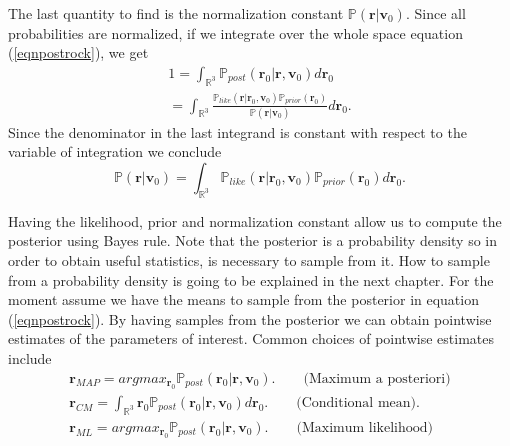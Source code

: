 \documentclass[12pt]{book}
\newcommand{\post}{\mathbb{P}_{post}}
\newcommand{\like}{\mathbb{P}_{like}}
\newcommand{\prior}{\mathbb{P}_{prior}}
\newcommand{\p}{\mathbb{P}}
\begin{document}
The last quantity to find is   the normalization constant $\p(\textbf{r}|\textbf{v}_{0})$. Since all
probabilities  are normalized, if we integrate over the whole space equation (\ref{eqnpostrock}), we get
\begin{eqnarray*}
1=\int_{\mathbb{R}^{3}}\post(\textbf{r}_{0}|\textbf{r},\textbf{v}_{0})d\textbf{r}_{0}\\
=\int_{\mathbb{R}^{3}}\frac{\like(\textbf{r}|\textbf{r}_{0},\textbf{v}_{0})
\prior(\textbf{r}_{0})}{\p(\textbf{r}|\textbf{v}_{0})}d\textbf{r}_{0}.
\end{eqnarray*} 
Since the denominator in the last integrand is  constant with respect to the variable of integration 
we conclude
\begin{equation*}
\p(\textbf{r}|\textbf{v}_{0})=\int_{\mathbb{R}^{3}}\like(\textbf{r}|\textbf{r}_{0},\textbf{v}_{0})
\prior(\textbf{r}_{0})d\textbf{r}_{0}.
\end{equation*}


Having the likelihood, prior and normalization constant allow us to compute the posterior using
Bayes rule. Note that the posterior is a probability density so in order to obtain useful
statistics,  is necessary to sample from it. How to sample from a probability density is going
to be explained in the next chapter. For the moment assume we have the means to sample from the 
posterior in equation (\ref{eqnpostrock}). By having samples from the posterior we can obtain
pointwise estimates of the parameters of interest. Common choices of pointwise estimates
include
\begin{eqnarray}\label{eqnpointestimates}
\textbf{r}_{MAP}=argmax_{\textbf{r}_{0}}\post(\textbf{r}_{0}|\textbf{r},\textbf{v}_{0}). 
\qquad\text{(Maximum a posteriori)}\\
\textbf{r}_{CM}=\int_{\mathbb{R}^{3}}\textbf{r}_{0}\post(\textbf{r}_{0}|\textbf{r},\textbf{v}_{0})d\textbf{r}_{0}.
\qquad\text{(Conditional mean)}. \\
\textbf{r}_{ML}=argmax_{\textbf{r}_{0}}\post(\textbf{r}_{0}|\textbf{r},\textbf{v}_{0}).
\qquad\text{(Maximum likelihood)}
\end{eqnarray}
\end{document}
